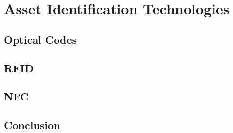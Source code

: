 \section{Asset Identification Technologies}

\subsection{Optical Codes}




\subsection{RFID}

\subsection{NFC}

\subsection{Conclusion}
